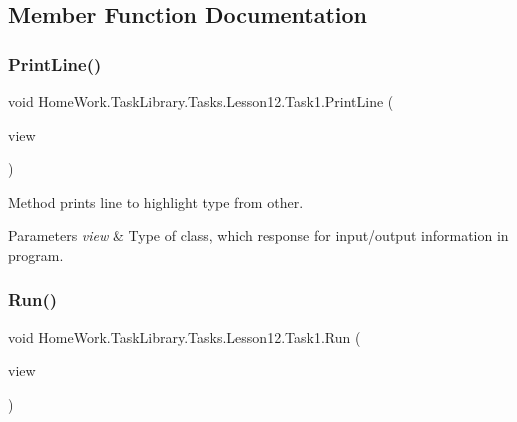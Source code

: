 \subsection{Member Function Documentation}
\mbox{\label{class_home_work_1_1_task_library_1_1_tasks_1_1_lesson12_1_1_task1_aa09cdb0b453542f74db88b71dde67d4b}} 
\subsubsection{\texorpdfstring{PrintLine()}{PrintLine()}}
{\footnotesize\ttfamily void Home\+Work.\+Task\+Library.\+Tasks.\+Lesson12.\+Task1.\+Print\+Line (\begin{DoxyParamCaption}\item[{I\+Information}]{view }\end{DoxyParamCaption})\hspace{0.3cm}{\ttfamily [private]}}



Method prints line to highlight type from other. 


\begin{DoxyParams}{Parameters}
{\em view} & Type of class, which response for input/output information in program.\\
\hline
\end{DoxyParams}
\mbox{\label{class_home_work_1_1_task_library_1_1_tasks_1_1_lesson12_1_1_task1_a9339a2bf78919df20e2732ee3ff177e8}} 
\subsubsection{\texorpdfstring{Run()}{Run()}}
{\footnotesize\ttfamily void Home\+Work.\+Task\+Library.\+Tasks.\+Lesson12.\+Task1.\+Run (\begin{DoxyParamCaption}\item[{I\+Information}]{view }\end{DoxyParamCaption})}



